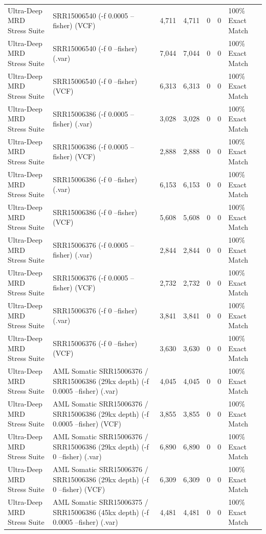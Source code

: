 \begin{table}[htbp]
{\begin{tabular}{lllllll}
Ultra-Deep MRD Stress Suite & SRR15006540 (-f 0.0005 --fisher) (VCF) & 4,711 & 4,711 & 0 & 0 & 100\% Exact Match \\
Ultra-Deep MRD Stress Suite & SRR15006540 (-f 0 --fisher) (.var) & 7,044 & 7,044 & 0 & 0 & 100\% Exact Match \\
Ultra-Deep MRD Stress Suite & SRR15006540 (-f 0 --fisher) (VCF) & 6,313 & 6,313 & 0 & 0 & 100\% Exact Match \\
Ultra-Deep MRD Stress Suite & SRR15006386 (-f 0.0005 --fisher) (.var) & 3,028 & 3,028 & 0 & 0 & 100\% Exact Match \\
Ultra-Deep MRD Stress Suite & SRR15006386 (-f 0.0005 --fisher) (VCF) & 2,888 & 2,888 & 0 & 0 & 100\% Exact Match \\
Ultra-Deep MRD Stress Suite & SRR15006386 (-f 0 --fisher) (.var) & 6,153 & 6,153 & 0 & 0 & 100\% Exact Match \\
Ultra-Deep MRD Stress Suite & SRR15006386 (-f 0 --fisher) (VCF) & 5,608 & 5,608 & 0 & 0 & 100\% Exact Match \\
Ultra-Deep MRD Stress Suite & SRR15006376 (-f 0.0005 --fisher) (.var) & 2,844 & 2,844 & 0 & 0 & 100\% Exact Match \\
Ultra-Deep MRD Stress Suite & SRR15006376 (-f 0.0005 --fisher) (VCF) & 2,732 & 2,732 & 0 & 0 & 100\% Exact Match \\
Ultra-Deep MRD Stress Suite & SRR15006376 (-f 0 --fisher) (.var) & 3,841 & 3,841 & 0 & 0 & 100\% Exact Match \\
Ultra-Deep MRD Stress Suite & SRR15006376 (-f 0 --fisher) (VCF) & 3,630 & 3,630 & 0 & 0 & 100\% Exact Match \\
Ultra-Deep MRD Stress Suite & AML Somatic SRR15006376 / SRR15006386 (29kx depth) (-f 0.0005 --fisher) (.var) & 4,045 & 4,045 & 0 & 0 & 100\% Exact Match \\
Ultra-Deep MRD Stress Suite & AML Somatic SRR15006376 / SRR15006386 (29kx depth) (-f 0.0005 --fisher) (VCF) & 3,855 & 3,855 & 0 & 0 & 100\% Exact Match \\
Ultra-Deep MRD Stress Suite & AML Somatic SRR15006376 / SRR15006386 (29kx depth) (-f 0 --fisher) (.var) & 6,890 & 6,890 & 0 & 0 & 100\% Exact Match \\
Ultra-Deep MRD Stress Suite & AML Somatic SRR15006376 / SRR15006386 (29kx depth) (-f 0 --fisher) (VCF) & 6,309 & 6,309 & 0 & 0 & 100\% Exact Match \\
Ultra-Deep MRD Stress Suite & AML Somatic SRR15006375 / SRR15006386 (45kx depth) (-f 0.0005 --fisher) (.var) & 4,481 & 4,481 & 0 & 0 & 100\% Exact Match \\

\end{tabular}}
\end{table}
